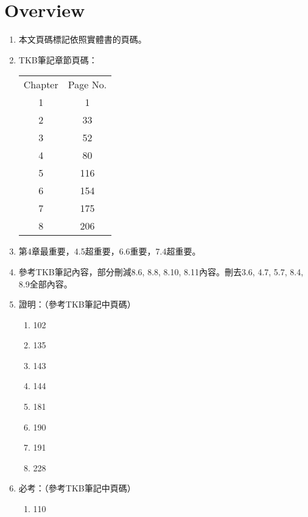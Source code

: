 \section{Overview}

\begin{enumerate}
    \item 本文頁碼標記依照實體書\cite{1}\cite{2}\cite{3}的頁碼。
    \item TKB筆記\cite{4}章節頁碼：
    \begin{table}[H]
        \centering
        \begin{tabular}{|c|c|}
            \hline
            Chapter & Page No. \\
            \Xhline{2\arrayrulewidth}
            1 & 1 \\
            \hline
            2 & 33 \\
            \hline
            3 & 52 \\
            \hline
            4 & 80 \\
            \hline
            5 & 116 \\
            \hline
            6 & 154 \\
            \hline
            7 & 175 \\
            \hline
            8 & 206 \\
            \hline
        \end{tabular}
    \end{table}
    \item 第4章最重要，4.5超重要，6.6重要，7.4超重要。
    \item 參考TKB筆記\cite{4}內容，部分刪減8.6, 8.8, 8.10, 8.11內容。刪去3.6, 4.7, 5.7, 8.4, 8.9全部內容。
    \item 證明：（參考TKB筆記\cite{4}中頁碼）
    \begin{enumerate}
        \item 102
        \item 135
        \item 143
        \item 144
        \item 181
        \item 190
        \item 191
        \item 228
    \end{enumerate}
    \item 必考：（參考TKB筆記\cite{4}中頁碼）
    \begin{enumerate}
        \item 110

\end{enumerate}
\end{enumerate}
